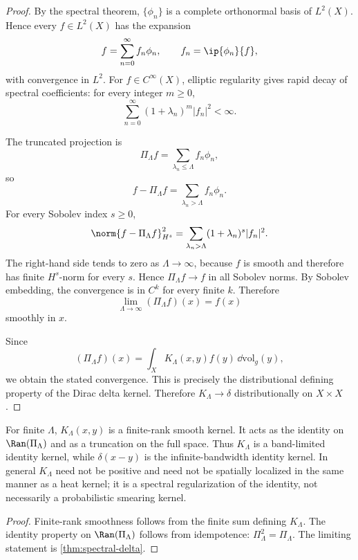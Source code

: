 \documentclass[11pt]{article}
\begin{document}
\begin{proof}
By the spectral theorem, \(\{\phi_n\}\) is a complete orthonormal basis of \(L^2(X)\).
Hence every \(f\in L^2(X)\) has the expansion
\[
f=\sum_{n=0}^{\infty} f_n\phi_n,\qquad f_n=\ip{\phi_n}{f},
\]
with convergence in \(L^2\).  For \(f\in C^\infty(X)\), elliptic regularity gives rapid
decay of spectral coefficients: for every integer \(m\geq 0\),
\begin{equation}
\sum_{n=0}^{\infty}(1+\lambda_n)^m|f_n|^2<\infty .
\end{equation}

The truncated projection is
\[
\Pi_\Lambda f=\sum_{\lambda_n\leq \Lambda}f_n\phi_n,
\]
so
\[
f-\Pi_\Lambda f=\sum_{\lambda_n>\Lambda}f_n\phi_n.
\]
For every Sobolev index \(s\geq 0\),
\begin{equation}
\norm{f-\Pi_\Lambda f}_{H^s}^2
=\sum_{\lambda_n>\Lambda}(1+\lambda_n)^s|f_n|^2 .
\end{equation}
The right-hand side tends to zero as \(\Lambda\to\infty\), because \(f\) is smooth and
therefore has finite \(H^s\)-norm for every \(s\).  Hence \(\Pi_\Lambda f\to f\) in all
Sobolev norms.  By Sobolev embedding, the convergence is in \(C^k\) for every finite
\(k\).  Therefore
\[
\lim_{\Lambda\to\infty}(\Pi_\Lambda f)(x)=f(x)
\]
smoothly in \(x\).

Since
\[
(\Pi_\Lambda f)(x)=\int_X K_\Lambda(x,y)f(y)\,\dd\mathrm{vol}_g(y),
\]
we obtain the stated convergence.  This is precisely the distributional defining property
of the Dirac delta kernel.  Therefore \(K_\Lambda\to\delta\) distributionally on
\(X\times X\).
\end{proof}

\begin{corollary}\label{cor:finite-proj}
For finite \(\Lambda\), \(K_\Lambda(x,y)\) is a finite-rank smooth kernel. It acts as the
identity on \(\Ran(\Pi_\Lambda)\) and as a truncation on the full space. Thus
\(K_\Lambda\) is a band-limited identity kernel, while \(\delta(x-y)\) is the
infinite-bandwidth identity kernel. In general \(K_\Lambda\) need not be positive and need
not be spatially localized in the same manner as a heat kernel; it is a spectral
regularization of the identity, not necessarily a probabilistic smearing kernel.
\end{corollary}

\begin{proof}
Finite-rank smoothness follows from the finite sum defining \(K_\Lambda\).  The identity
property on \(\Ran(\Pi_\Lambda)\) follows from idempotence:
\(\Pi_\Lambda^2=\Pi_\Lambda\).  The limiting statement is \cref{thm:spectral-delta}.
\end{proof}
\end{document}

